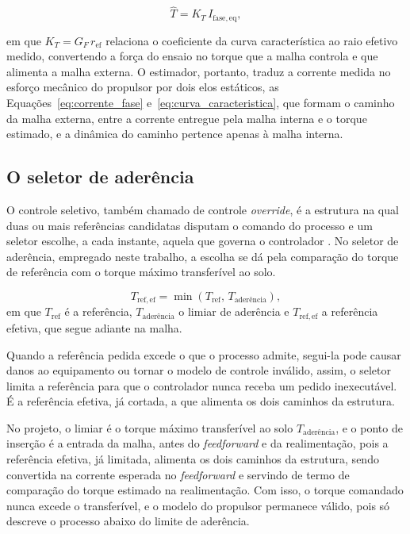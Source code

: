 \begin{equation}\label{eq:estimador_proposta}
\hat{T} = K_T\,I_{\mathrm{fase,eq}},
\end{equation}

em que $K_T = G_F\,r_{\mathrm{ef}}$ relaciona o coeficiente da curva característica ao
raio efetivo medido, convertendo a força do ensaio no torque que a malha controla e que
alimenta a malha externa. O estimador, portanto, traduz a corrente medida no esforço
mecânico do propulsor por dois elos estáticos, as Equações~\eqref{eq:corrente_fase}
e~\eqref{eq:curva_caracteristica}, que formam o caminho da malha externa, entre a corrente
entregue pela malha interna e o torque estimado, e a dinâmica do caminho pertence apenas à
malha interna.

\subsection{O seletor de aderência}
\label{sec:seletor}

O controle seletivo, também chamado de controle \emph{override}, é a estrutura na qual
duas ou mais referências candidatas disputam o comando do processo e um seletor
escolhe, a cada instante, aquela que governa o controlador \cite{raffo_tcpi_cascata}.
No seletor de aderência, empregado neste trabalho, a escolha se dá pela comparação do torque
de referência com o torque máximo transferível ao solo.

\begin{equation}\label{eq:seletor}
T_{\mathrm{ref,ef}} = \min\left(T_{\mathrm{ref}},\,T_{\text{ader\^{e}ncia}}\right),
\end{equation}
em que $T_{\mathrm{ref}}$ é a referência, $T_{\text{ader\^{e}ncia}}$ o limiar de
aderência e $T_{\mathrm{ref,ef}}$ a referência efetiva, que segue adiante na malha.

Quando a referência pedida excede o que o processo admite, segui-la pode causar danos ao
equipamento ou tornar o modelo de controle inválido, assim, o seletor limita a referência para que 
o controlador nunca receba um pedido inexecutável. É a referência efetiva, já cortada, a que
alimenta os dois caminhos da estrutura.

No projeto, o limiar é o torque máximo transferível ao solo $T_{\text{ader\^{e}ncia}}$, e o
ponto de inserção é a entrada da malha, antes do \emph{feedforward} e da realimentação, pois a
referência efetiva, já limitada, alimenta os dois caminhos da estrutura, sendo
convertida na corrente esperada no \emph{feedforward} e servindo de termo de comparação do
torque estimado na realimentação. Com isso, o torque comandado
nunca excede o transferível, e o modelo do propulsor permanece válido, pois só descreve o
processo abaixo do limite de aderência.


